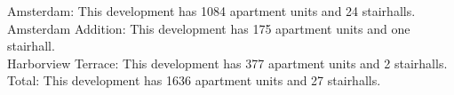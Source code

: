 {Amsterdam}: This development has 1084 apartment units and 24 stairhalls.\\{Amsterdam Addition}: This development has 175 apartment units and one stairhall.\\{Harborview Terrace}: This development has 377 apartment units and 2 stairhalls.\\{Total}: This development has 1636 apartment units and 27 stairhalls.\\